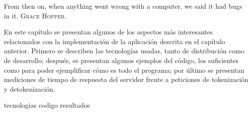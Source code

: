 %
%
%

{
  \epigrafe
  {%
    From then on, when anything went wrong with a computer, we said it had bugs
    in it.%
  }
  {%
     \textsc{Grace Hopper}.%
  }
}

\noindent
En este capítulo se presentan algunos de los aspectos más interesantes
relacionados con la implementación de la aplicación descrita en el capítulo
anterior. Primero se describen las tecnologías usadas, tanto de distribución
como de desarrollo; después, se presentan algunos ejemplos del código, los
suficientes como para poder ejemplificar cómo es todo el programa; por último
se presentan mediciones de tiempo de respuesta del servidor frente a peticiones
de tokenización y detokenización.

{tecnologias}
{codigo}
{resultados}
